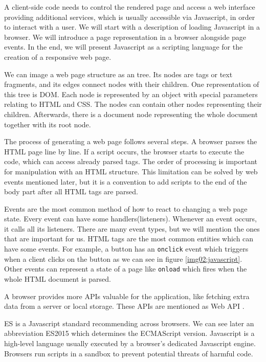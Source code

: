 A client-side code needs to control the rendered page and access a web interface providing additional services, which is usually accessible via Javascript, in order to interact with a user.
We will start with a description of loading Javascript in a browser.
We will introduce a page representation in a browser alongside page events.
In the end, we will present Javascript as a scripting language for the creation of a responsive web page.
\par
We can image a web page structure as an tree.
Its nodes are tags or text fragments, and its edges connect nodes with their children.
One representation of this tree is \ac{DOM}.
Each node is represented by an object with special parameters relating to HTML and CSS. 
The nodes can contain other nodes representing their children.
Afterwards, there is a document node representing the whole document together with its root node.
\par
The process of generating a web page follows several steps.
A browser parses the HTML page line by line. If a script occurs, the browser starts to execute the code, which can access already parsed tags.
The order of processing is important for manipulation with an HTML structure.
This limitation can be solved by web events mentioned later, but
it is a convention to add scripts to the end of the body part after all HTML tags are parsed.
\par
Events are the most common method of how to react to changing a web page state.
Every event can have some handlers(listeners).
Whenever an event occurs, it calls all its listeners.
There are many event types, but we will mention the ones that are important for us.
HTML tags are the most common entities which can have some events.
For example, a button has an \texttt{onclick} event which triggers when a client clicks on the button as we can see in figure \ref{img02:javascript}. 
Other events can represent a state of a page like \texttt{onload} which fires when the whole HTML document is parsed.
\par
A browser provides more APIs valuable for the application, like fetching extra data from a server or local storage.
These APIs are mentioned as Web API .
\par
\ac{ES} is a Javascript standard recommending across browsers.
We can see later an abbreviation ES2015 which determines the ECMAScript version.
Javascript is a high-level language usually executed by a browser's dedicated Javascript engine.
Browsers run scripts in a sandbox to prevent potential threats of harmful code.
